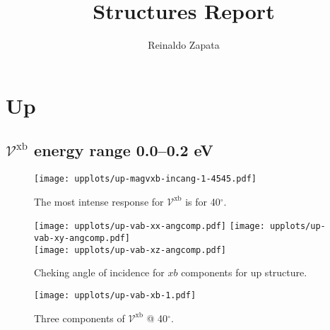 \documentclass{article}
\title{Structures Report}
\author{Reinaldo Zapata}
\date{}
\let\Oldsection\section
\renewcommand{\section}{\FloatBarrier\Oldsection}
\let\Oldsubsection\subsection
\renewcommand{\subsection}{\FloatBarrier\Oldsubsection}
\begin{document}
\maketitle


\section{Up} %
\label{sec:up}


\subsection{$\mathcal{V}^{\mathrm{xb}}$ energy range 0.0--0.2 eV }
\begin{figure}[h]
    \centering
    \texttt{[image: upplots/up-magvxb-incang-1-4545.pdf]}
    \caption{The most intense response for $\mathcal{V}^{\mathrm{xb}} $ is for 
    40$^{\circ}$.}
    \label{fig:up-magvxbincang1}
\end{figure}
\begin{figure}[h]
    \centering
    \texttt{[image: upplots/up-vab-xx-angcomp.pdf]}
    \texttt{[image: upplots/up-vab-xy-angcomp.pdf]}\\
    \texttt{[image: upplots/up-vab-xz-angcomp.pdf]}
    \caption{Cheking angle of incidence for $xb$ components for up structure.}
    \label{fig:up-xbangcomp}
\end{figure}
\begin{figure}[tb]
    \centering
    \texttt{[image: upplots/up-vab-xb-1.pdf]}
    \caption{Three components of $\mathcal{V}^{\mathrm{xb}} $ @ 40$^{\circ}$.}
    \label{fig:up-vxb1}
\end{figure}



\end{document}
